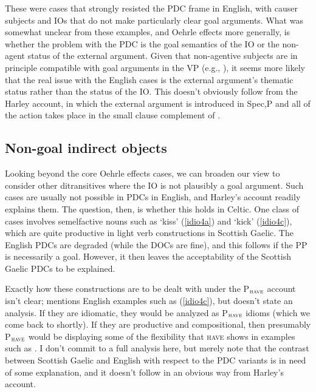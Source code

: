 \documentclass[output=paper,colorlinks,citecolor=brown]{langscibook}
\begin{document}
\noindent These were cases that strongly resisted the PDC frame in English, with causer subjects and IOs that do not make particularly clear goal arguments. What was somewhat unclear from these examples, and Oehrle effects more generally, is whether the problem with the PDC is the goal semantics of the IO or the non-agent status of the external argument. Given that non-agentive subjects are in principle compatible with goal arguments in the VP (e.g., ), it seems more likely that the real issue with the English cases is the external argument's thematic status rather than the status of the IO. This doesn't obviously follow from the Harley account, in which the external argument is introduced in Spec,P and all of the action takes place in the small clause complement of . 

\subsection{Non-goal indirect objects}

Looking beyond the core Oehrle effects cases, we can broaden our view to consider other ditransitives where the IO is not plausibly a goal argument. Such cases are usually not possible in PDCs in English, and Harley's account readily explains them. The question, then, is whether this holds in Celtic. One class of cases involves semelfactive nouns such as  `kiss' (\ref{idio4a}) and  `kick' (\ref{idio4c}), which are quite productive in light verb constructions in Scottish Gaelic. The English PDCs are degraded (while the DOCs are fine), and this follows if the PP is necessarily a goal. However, it then leaves the acceptability of the Scottish Gaelic PDCs to be explained. 


\noindent Exactly how these constructions are to be dealt with under the P$_{\textsc{have}}$ account isn't clear; \citet[39]{gt:Harley:2002a} mentions English examples such as (\ref{idio4c}), but doesn't state an analysis. If they are idiomatic, they would be analyzed as P$_{\textsc{have}}$ idioms (which we come back to shortly). If they are productive and compositional, then presumably P$_{\textsc{have}}$ would be displaying some of the flexibility that \textsc{have} shows in examples such as . I don't commit to a full analysis here, but merely note that the contrast between Scottish Gaelic and English with respect to the PDC variants is in need of some explanation, and it doesn't follow in an obvious way from Harley's account.
\end{document}
